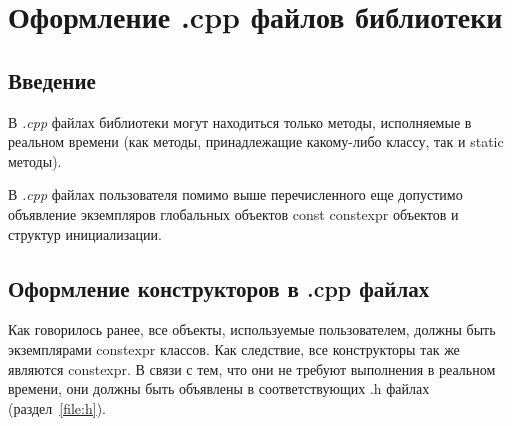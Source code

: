 \chapter{Оформление .cpp файлов библиотеки}\label{cpp:intr}
\section{Введение}
В \textit{.cpp} файлах библиотеки могут находиться только методы, исполняемые в реальном времени (как методы, принадлежащие какому-либо классу, так и static методы).

В \textit{.cpp} файлах пользователя помимо выше перечисленного еще допустимо объявление экземпляров глобальных объектов const constexpr объектов и структур инициализации.

\section{Оформление конструкторов в .cpp файлах}
Как говорилось ранее, все объекты, используемые пользователем, должны быть экземплярами constexpr классов. Как следствие, все конструкторы так же являются constexpr. В связи с тем, что они не требуют выполнения в реальном времени, они должны быть объявлены в соответствующих .h файлах (раздел~\ref{file:h}).